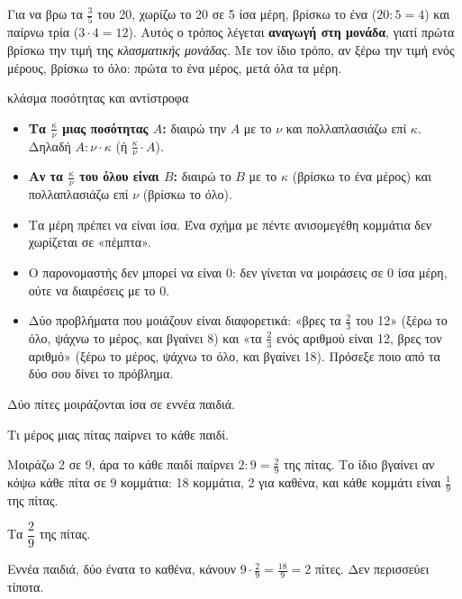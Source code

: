 
Για να βρω τα $\frac{3}{5}$ του 20, χωρίζω το 20 σε 5 ίσα μέρη, βρίσκω το ένα ($20:5=4$) και παίρνω τρία ($3\cdot 4=12$). Αυτός ο τρόπος λέγεται \textbf{αναγωγή στη μονάδα}, γιατί πρώτα βρίσκω την τιμή της \emph{κλασματικής μονάδας}. Με τον ίδιο τρόπο, αν ξέρω την τιμή ενός μέρους, βρίσκω το όλο: πρώτα το ένα μέρος, μετά όλα τα μέρη.

\begin{kanonas}{κλάσμα ποσότητας και αντίστροφα}
\begin{itemize}[leftmargin=1.2em,itemsep=0.2ex,topsep=2pt]
\item \textbf{Τα $\frac{\kappa}{\nu}$ μιας ποσότητας $A$:} διαιρώ την $A$ με το $\nu$ και πολλαπλασιάζω επί $\kappa$. Δηλαδή $A:\nu\cdot\kappa$ (ή $\frac{\kappa}{\nu}\cdot A$).
\item \textbf{Αν τα $\frac{\kappa}{\nu}$ του όλου είναι $B$:} διαιρώ το $B$ με το $\kappa$ (βρίσκω το ένα μέρος) και πολλαπλασιάζω επί $\nu$ (βρίσκω το όλο).
\end{itemize}
\end{kanonas}

\begin{prosoxi}
\begin{itemize}[leftmargin=1.2em,itemsep=0.3ex,topsep=2pt]
\item Τα μέρη πρέπει να είναι ίσα. Ένα σχήμα με πέντε ανισομεγέθη κομμάτια δεν χωρίζεται σε «πέμπτα».
\item Ο παρονομαστής δεν μπορεί να είναι 0: δεν γίνεται να μοιράσεις σε 0 ίσα μέρη, ούτε να διαιρέσεις με το 0.
\item Δύο προβλήματα που μοιάζουν είναι διαφορετικά: «βρες τα $\frac{2}{3}$ του 12» (ξέρω το όλο, ψάχνω το μέρος, και βγαίνει 8) και «τα $\frac{2}{3}$ ενός αριθμού είναι 12, βρες τον αριθμό» (ξέρω το μέρος, ψάχνω το όλο, και βγαίνει 18). Πρόσεξε ποιο από τα δύο σου δίνει το πρόβλημα.
\end{itemize}
\end{prosoxi}


\tixero Δύο πίτες μοιράζονται ίσα σε εννέα παιδιά.\par
\tithelo Τι μέρος μιας πίτας παίρνει το κάθε παιδί.\par
\possindeo Μοιράζω 2 σε 9, άρα το κάθε παιδί παίρνει $2:9=\frac{2}{9}$ της πίτας. Το ίδιο βγαίνει αν κόψω κάθε πίτα σε 9 κομμάτια: 18 κομμάτια, 2 για καθένα, και κάθε κομμάτι είναι $\frac{1}{9}$ της πίτας.\par
\apantisi Τα $\dfrac{2}{9}$ της πίτας.\par
\elegxos Εννέα παιδιά, δύο ένατα το καθένα, κάνουν $9\cdot\frac{2}{9}=\frac{18}{9}=2$ πίτες. Δεν περισσεύει τίποτα.

